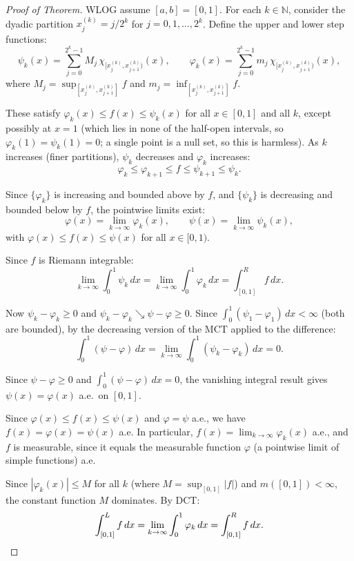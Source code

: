 \documentclass[11pt]{report}
\begin{document}
\begin{proof}[Proof of Theorem]
WLOG assume $[a, b] = [0, 1]$. For each $k \in \mathbb{N}$, consider the dyadic partition $x_j^{(k)} = j/2^k$ for $j = 0, 1, \ldots, 2^k$. Define the upper and lower step functions:
\[
\psi_k(x) = \sum_{j=0}^{2^k - 1} M_j\,\chi_{[x_j^{(k)}, x_{j+1}^{(k)})}(x), \qquad \varphi_k(x) = \sum_{j=0}^{2^k - 1} m_j\,\chi_{[x_j^{(k)}, x_{j+1}^{(k)})}(x),
\]
where $M_j = \sup_{[x_j^{(k)}, x_{j+1}^{(k)}]} f$ and $m_j = \inf_{[x_j^{(k)}, x_{j+1}^{(k)}]} f$.

These satisfy $\varphi_k(x) \leq f(x) \leq \psi_k(x)$ for all $x \in [0,1]$ and all $k$, except possibly at $x = 1$ (which lies in none of the half-open intervals, so $\varphi_k(1) = \psi_k(1) = 0$; a single point is a null set, so this is harmless). As $k$ increases (finer partitions), $\psi_k$ decreases and $\varphi_k$ increases:
\[
\varphi_k \leq \varphi_{k+1} \leq f \leq \psi_{k+1} \leq \psi_k.
\]

Since $\{\varphi_k\}$ is increasing and bounded above by $f$, and $\{\psi_k\}$ is decreasing and bounded below by $f$, the pointwise limits exist:
\[
\varphi(x) = \lim_{k \to \infty} \varphi_k(x), \qquad \psi(x) = \lim_{k \to \infty} \psi_k(x),
\]
with $\varphi(x) \leq f(x) \leq \psi(x)$ for all $x \in [0,1)$.

Since $f$ is Riemann integrable:
\[
\lim_{k \to \infty} \int_0^1 \psi_k\,dx = \lim_{k \to \infty} \int_0^1 \varphi_k\,dx = \int_{[0,1]}^R f\,dx.
\]

Now $\psi_k - \varphi_k \geq 0$ and $\psi_k - \varphi_k \searrow \psi - \varphi \geq 0$. Since $\int_0^1 (\psi_1 - \varphi_1)\,dx < \infty$ (both are bounded), by the decreasing version of the MCT applied to the difference:
\[
\int_0^1 (\psi - \varphi)\,dx = \lim_{k \to \infty} \int_0^1 (\psi_k - \varphi_k)\,dx = 0.
\]

Since $\psi - \varphi \geq 0$ and $\int_0^1 (\psi - \varphi)\,dx = 0$, the vanishing integral result gives $\psi(x) = \varphi(x)$ a.e.\ on $[0,1]$.

Since $\varphi(x) \leq f(x) \leq \psi(x)$ and $\varphi = \psi$ a.e., we have $f(x) = \varphi(x) = \psi(x)$ a.e. In particular, $f(x) = \lim_{k \to \infty} \varphi_k(x)$ a.e., and $f$ is measurable, since it equals the measurable function $\varphi$ (a pointwise limit of simple functions) a.e.

Since $|\varphi_k(x)| \leq M$ for all $k$ (where $M = \sup_{[0,1]} |f|$) and $m([0,1]) < \infty$, the constant function $M$ dominates. By DCT:
\[
\int_{[0,1]}^L f\,dx = \lim_{k \to \infty} \int_0^1 \varphi_k\,dx = \int_{[0,1]}^R f\,dx. \qedhere
\]
\end{proof}
\end{document}
